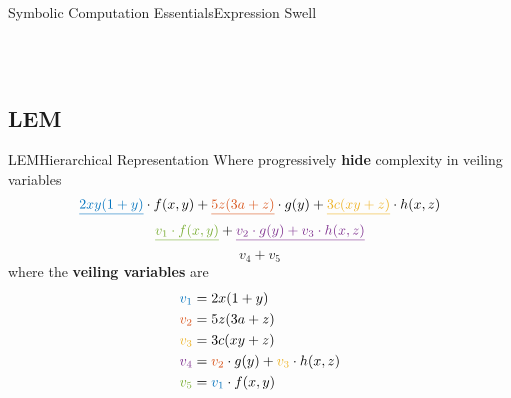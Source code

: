 \begin{frame}{Symbolic Computation Essentials}{Expression Swell}
{{\begin{tabular}{cc}
  \end{tabular}}} \\[0.5em]
\end{frame}

\subsection{\acl{LEM}}

\begin{frame}{\acl{LEM}}{Hierarchical Representation}
  Where progressively \textbf{hide} complexity in veiling variables
  \begin{equation*}
    \textcolor{mycolor1}{\underline{2xy(1+y)}} \cdot f(x,y) + \textcolor{mycolor2}{\underline{5z(3a+z)}} \cdot g(y) + \textcolor{mycolor3}{\underline{3c(xy+z)}} \cdot h(x,z)
  \end{equation*}
  \begin{equation*}
    \textcolor{mycolor5}{\underline{v_1 \cdot f(x,y)}} + \textcolor{mycolor4}{\underline{v_2 \cdot g(y) + v_3 \cdot h(x,z)}}
  \end{equation*}
  \begin{equation*}
    v_4 + v_5
  \end{equation*}
  where the \textbf{veiling variables} are
  \begin{align*}
    \textcolor{mycolor1}{v_1} &= 2x(1+y) \\
    \textcolor{mycolor2}{v_2} &= 5z(3a+z) \\
    \textcolor{mycolor3}{v_3} &= 3c(xy+z) \\
    \textcolor{mycolor4}{v_4} &= \textcolor{mycolor2}{v_2} \cdot g(y) + \textcolor{mycolor3}{v_3} \cdot h(x,z) \\
    \textcolor{mycolor5}{v_5} &= \textcolor{mycolor1}{v_1} \cdot f(x,y)
  \end{align*}
\end{frame}

